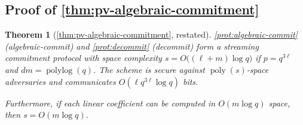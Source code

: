 \documentclass[a4paper,UKenglish,cleveref, autoref, thm-restate]{lipics-v2021}
\newtheorem{theorem}{Theorem}[section]
\theoremstyle{definition}
\newcommand{\poly}{\operatorname{poly}}
\newcommand{\polylog}{\operatorname{polylog}}
\newcommand{\pcommitlength}{p}
\newcommand{\dimension}{m}
\newcommand{\degree}{d}
\newcommand{\fieldsize}{q}
\begin{document}
\subsection{Proof of \texorpdfstring{\cref{thm:pv-algebraic-commitment}}{Theorem \ref{thm:pv-algebraic-commitment}}}
\label{sec:deferred-pv-algebraic-commit}

\begin{theorem}[\cref{thm:pv-algebraic-commitment}, restated]
    \cref{prot:algebraic-commit} (\textsf{algebraic-commit}) and \cref{prot:decommit} (\textsf{decommit}) form a streaming commitment protocol with space complexity $s = O\big((\ell + \dimension) \log \fieldsize\big)$ if $\pcommitlength = \fieldsize^{3\ell}$ and $\degree \dimension = \polylog(\fieldsize)$. The scheme is secure against $\poly(s)$-space adversaries and communicates $O(\ell \fieldsize^{3 \ell} \log \fieldsize)$ bits.
    
    Furthermore, if each linear coefficient can be computed in $O(\dimension \log \fieldsize)$ space, then $s = O(\dimension \log \fieldsize)$.
\end{theorem}
\end{document}
